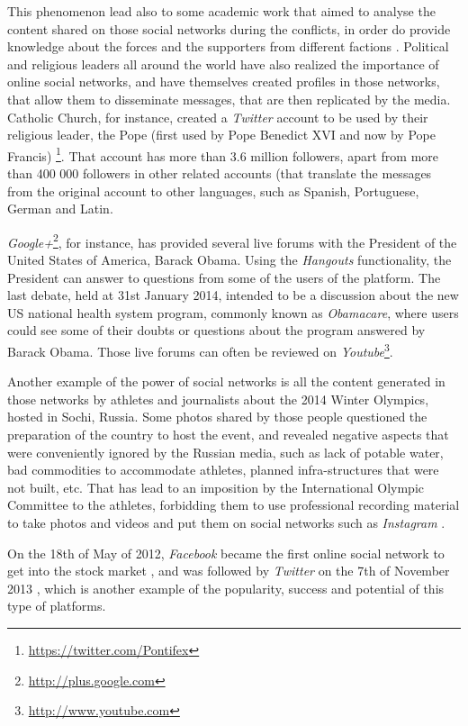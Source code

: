 This phenomenon lead also to some academic work that aimed to analyse the content shared on those social networks during the conflicts, in order do provide knowledge about the forces and the supporters from different factions \cite{kn:OPG+14}.
Political and religious leaders all around the world have also realized the importance of online social networks, and have themselves created profiles in those networks, that allow them to disseminate messages, that are then replicated by the media. Catholic Church, for instance, created a \emph{Twitter} account to be used by their religious leader, the Pope (first used by Pope Benedict XVI and now by Pope Francis) \footnote{\url{https://twitter.com/Pontifex}}. That account has more than 3.6 million followers, apart from more than 400 000 followers in other related accounts (that translate the messages from the original account to other languages, such as Spanish, Portuguese, German and Latin.

\emph{Google+}\footnote{\url{http://plus.google.com}}, for instance, has provided several live forums with the President of the United States of America, Barack Obama. Using the \emph{Hangouts} functionality, the President can answer to questions from some of the users of the platform. The last debate, held at 31st January 2014, intended to be a discussion about the new US national health system program, commonly known as \emph{Obamacare}, where users could see some of their doubts or questions about the program answered by Barack Obama. Those live forums can often be reviewed on \emph{Youtube}\footnote{\url{http://www.youtube.com}}.

Another example of the power of social networks is all the content generated in those networks by athletes and journalists about the 2014 Winter Olympics, hosted in Sochi, Russia. Some photos shared by those people questioned the preparation of the country to host the event, and revealed negative aspects that were conveniently ignored by the Russian media, such as lack of potable water, bad commodities to accommodate athletes, planned infra-structures that were not built, etc. That has lead to an imposition by the International Olympic Committee to the athletes, forbidding them to use professional recording material to take photos and videos and put them on social networks such as \emph{Instagram} \cite{kn:Sop14}.

On the 18th of May of 2012, \emph{Facebook} became the first online social network to get into the stock market \cite{kn:Del11}, and was followed by \emph{Twitter} on the 7th of November 2013 \cite{kn:Pos13}, which is another example of the popularity, success and potential of this type of platforms. 

